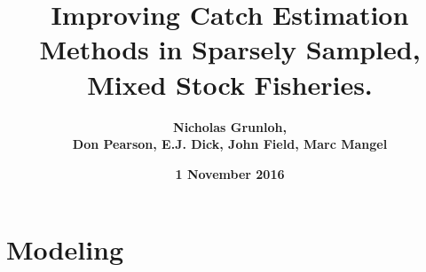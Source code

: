 \documentclass[ xcolor = pdftex, dvipsnames, table ]{beamer}
\begin{document}
%
%

\title{\textbf{Improving Catch Estimation Methods in Sparsely Sampled, Mixed Stock Fisheries.}}

\author{
\textbf{Nicholas Grunloh, }\\%
\textbf{Don Pearson, E.J. Dick, John Field, Marc Mangel}
}




\date{
\textbf{1 November 2016}
}

%
%

%
%

%
\newcommand*{\Line}[3][]{\tikz \draw[#1] #2 -- #3;}
\section{Modeling}
\end{document}
